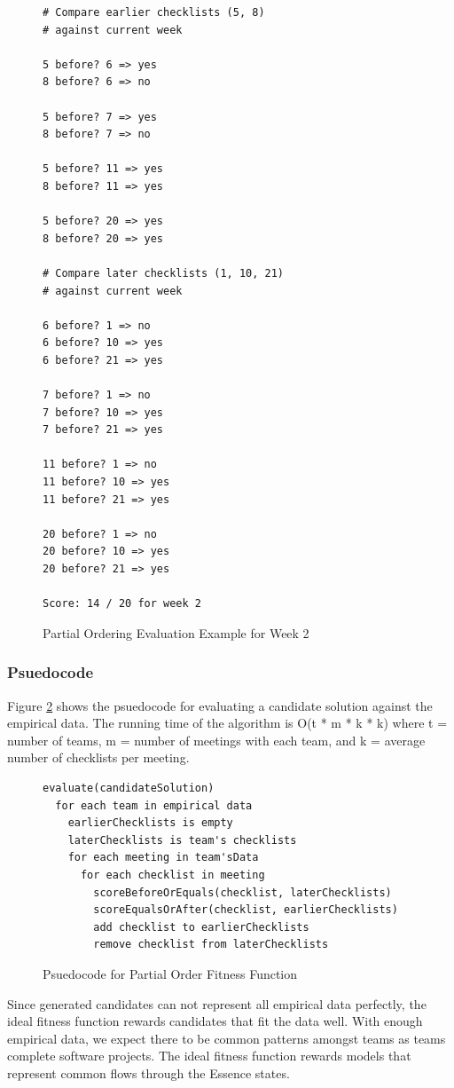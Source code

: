 \documentclass[conference]{IEEEtran}
\begin{document}
\begin{figure}[!htb]
\begin{verbatim}
# Compare earlier checklists (5, 8)
# against current week

5 before? 6 => yes
8 before? 6 => no

5 before? 7 => yes
8 before? 7 => no

5 before? 11 => yes
8 before? 11 => yes

5 before? 20 => yes
8 before? 20 => yes

# Compare later checklists (1, 10, 21)
# against current week

6 before? 1 => no
6 before? 10 => yes
6 before? 21 => yes

7 before? 1 => no
7 before? 10 => yes
7 before? 21 => yes

11 before? 1 => no
11 before? 10 => yes
11 before? 21 => yes

20 before? 1 => no
20 before? 10 => yes
20 before? 21 => yes

Score: 14 / 20 for week 2
\end{verbatim}
 \caption{Partial Ordering Evaluation Example for Week 2}
 \label{evaluation_example}
\end{figure}

\subsubsection{Psuedocode}
Figure \ref{psuedocode} shows the psuedocode for evaluating a candidate solution against the empirical data. The running time of the algorithm is O(t * m * k * k) where
t = number of teams,
m = number of meetings with each team, and
k = average number of checklists per meeting.

\begin{figure}[ht]
\begin{verbatim}
evaluate(candidateSolution)
  for each team in empirical data
    earlierChecklists is empty
    laterChecklists is team's checklists
    for each meeting in team'sData
      for each checklist in meeting
        scoreBeforeOrEquals(checklist, laterChecklists)
        scoreEqualsOrAfter(checklist, earlierChecklists)
        add checklist to earlierChecklists 
        remove checklist from laterChecklists
\end{verbatim}
 \caption{Psuedocode for Partial Order Fitness Function}
 \label{psuedocode}
\end{figure}

Since generated candidates can not represent all empirical data perfectly, the ideal fitness function rewards candidates that fit the data well. With enough empirical data, we expect there to be common patterns amongst teams as teams complete software projects. The ideal fitness function rewards models that represent common flows through the Essence states.
\end{document}
